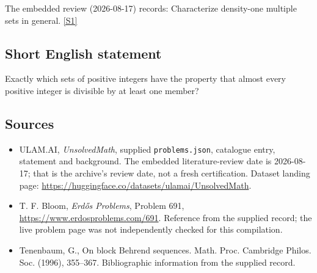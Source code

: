 \documentclass[11pt,a4paper]{article}
\newcommand{\sref}[2]{\hyperlink{source:#1:#2}{[S#2]}}
\begin{document}
The embedded review (2026-08-17) records: Characterize density-one multiple sets in general. \sref{statement}{1}

\subsection{Short English statement}

Exactly which sets of positive integers have the property that almost every positive integer is divisible by at least one member?

\subsection{Sources}

{\small

\begin{itemize}

\item[\hypertarget{source:statement:1}{S1}] ULAM.AI, \emph{UnsolvedMath}, supplied \texttt{problems.json}, catalogue entry, statement and background. The embedded literature-review date is 2026-08-17; that is the archive’s review date, not a fresh certification. Dataset landing page: \url{https://huggingface.co/datasets/ulamai/UnsolvedMath}.

\item[\hypertarget{source:statement:2}{S2}] T. F. Bloom, \emph{Erdős Problems}, Problem 691, \url{https://www.erdosproblems.com/691}. Reference from the supplied record; the live problem page was not independently checked for this compilation.

\item[\hypertarget{source:statement:3}{S3}] Tenenbaum, G., On block {B}ehrend sequences. Math. Proc. Cambridge Philos. Soc. (1996), 355--367. Bibliographic information from the supplied record.

\end{itemize}

}

\label{end:statement}
\end{document}

